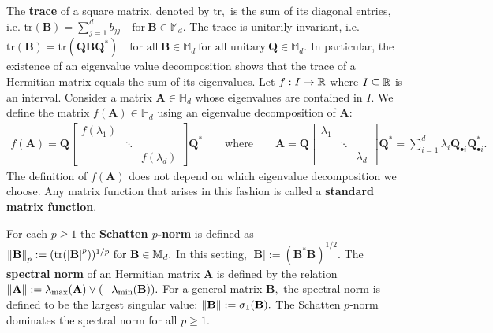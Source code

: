   The \textbf{trace} of a square matrix, denoted by $\mathrm{tr},$
  is the sum of its diagonal entries, i.e. 
  $
    \mathrm{tr}(\mathbf{B})
    =
    \sum_{j=1}^{d}b_{jj}
    \quad 
    \text{for}\ 
    \mathbf{B} \in \mathbb{M}_d.
  $
  The trace is unitarily invariant, i.e.
  $
    \mathrm{tr}(\mathbf{B})
    =
    \mathrm{tr}(\mathbf{Q}\mathbf{B}\mathbf{Q}^*)
    \quad 
    \text{for all}
    \ 
    \mathbf{B}\in \mathbb{M}_d
    \ 
    \text{for all unitary}\ 
    \mathbf{Q} \in \mathbb{M}_d.
  $
  In particular, the existence of an eigenvalue value decomposition shows 
  that the trace of a Hermitian matrix equals the sum of its  eigenvalues.
  Let
  $
  f: I\to \mathbb{R}
  $
  where 
  $I\subseteq\mathbb{R}$ 
  is an interval.
  Consider a matrix 
  $\mathbf{A}\in \mathbb{H}_d$
  whose eigenvalues are contained in $I.$
  We define the matrix 
  $
    f(\mathbf{A})\in \mathbb{H}_d
  $
  using an eigenvalue decomposition of $\mathbf{A}:$
  \begin{gather}
    f(\mathbf{A})
    =
    \mathbf{Q}
    \begin{bmatrix}
      f(\lambda_1) &&\\
                   &\ddots&\\
                   && f(\lambda_d)
    \end{bmatrix}
    \mathbf{Q}^*
    \qquad
    \text{where}
    \qquad
    \mathbf{A}
    =
    \mathbf{Q}
    \begin{bmatrix}
      \lambda_1 &&\\
                   &\ddots&\\
                   && \lambda_d
    \end{bmatrix}
    \mathbf{Q}^*
    =
    \sum_{i=1}^{d} 
    \lambda_i
    \mathbf{Q}_{\bullet i}
    \mathbf{Q}_{\bullet i}^*
    .
  \end{gather}
  The definition of $f(\mathbf{A})$ does not depend on which 
  eigenvalue decomposition we choose.
  Any matrix function that arises in this fashion is called a \textbf{standard matrix function}.

  For each $p\ge 1$
  the \textbf{Schatten $p$-norm} is defined as 
  $
    \norm{\mathbf{B}}_p
    :=
    (
    \mathrm{tr}(\left| \mathbf{B} \right|^p)
    )
    ^{1/p}
    \ 
    \text{for}
    \ 
    \mathbf{B} \in \mathbb{M}_d.
  $
  In this setting,
  $
  \left| \mathbf{B} \right|
  :=
  (
    \mathbf{B}^*
    \mathbf{B}
    )^{1/2}
    .
  $
  The \textbf{spectral norm}
  of an Hermitian matrix $\mathbf{A}$
  is defined by the relation
  $
    \left\lVert\mathbf{A}\right\rVert
    :=
    \lambda_{\mathrm{max}}(\mathbf{A})
    \lor
    (
    -\lambda_{\mathrm{min}}(\mathbf{B})
    )
    .
  $
  For a general matrix $\mathbf{B},$
  the spectral norm is defined to be the largest singular value:
  $
    \left\lVert\mathbf{B}\right\rVert
    :=
    \sigma_1(\mathbf{B})
    .
  $
  The Schatten $p$-norm dominates the spectral norm for all $p\ge 1.$



